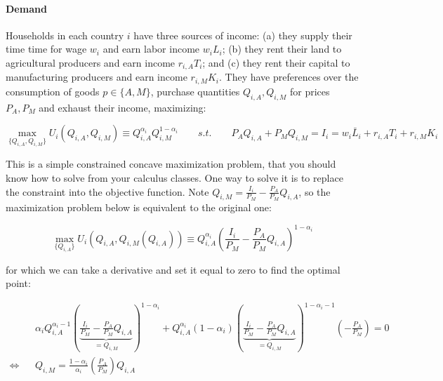 \documentclass[11pt,letterpaper]{article}
\begin{document}
\paragraph{Demand} Households in each country $i$ have three sources of income: (a) they supply their time time for wage $w_i$ and earn labor income $w_i L_i$; (b) they rent their land to agricultural producers and earn income $r_{i,A} T_{i}$; and (c) they rent their capital to manufacturing producers and earn income $r_{i,M} K_{i}$. They have preferences over the consumption of goods $p \in \{ A, M\}$, purchase quantities $Q_{i,A}, Q_{i,M}$ for prices $P_{A}, P_{M}$ and exhaust their income, maximizing:

\begin{equation*}
    \max_{\{Q_{i,A}, Q_{i,M}\}} U_i(Q_{i,A}, Q_{i,M}) \equiv Q_{i,A}^{\alpha_i} Q_{i,M}^{1-\alpha_i} \qquad s.t. \qquad P_{A} Q_{i,A} + P_{M} Q_{i,M} = I_i = w_i \bar{L}_i + r_{i,A} T_{i} + r_{i,M} K_{i}
\end{equation*}

This is a simple constrained concave maximization problem, that you should know how to solve from your calculus classes. One way to solve it is to replace the constraint into the objective function. Note $Q_{i,M} = \frac{I_i}{P_{M}} - \frac{P_{A}}{P_{M} } Q_{i,A}$, so the maximization problem below is equivalent to the original one:

\begin{equation*}
    \max_{\{Q_{i,A}\}} U_i(Q_{i,A}, Q_{i,M}(Q_{i,A})) \equiv Q_{i,A}^{\alpha_i} \left( \frac{I_i}{P_{M}} - \frac{P_{A}}{P_{M} } Q_{i,A} \right)^{1-\alpha_i}
\end{equation*}

\noindent for which we can take a derivative and set it equal to zero to find the optimal point:

\scriptsize{
\begin{eqnarray*}
    & & \alpha_i Q_{i,A}^{\alpha_i-1} \left( \underbrace{\frac{I_i}{P_{M}} - \frac{P_{A}}{P_{M} } Q_{i,A}}_{=Q_{i,M}} \right)^{1-\alpha_i} + Q_{i,A}^{\alpha_i} (1-\alpha_i) \left( \underbrace{\frac{I_i}{P_{M}} - \frac{P_{A}}{P_{M} } Q_{i,A}}_{=Q_{i,M}} \right)^{1-\alpha_i-1} \left( - \frac{P_{A}}{P_{M}}\right) = 0 \\
\iff    & & Q_{i,M}  = \frac{1-\alpha_i}{\alpha_i } \left( \frac{P_{A}}{P_{M}}\right) Q_{i,A}
\end{eqnarray*}
}
\end{document}
